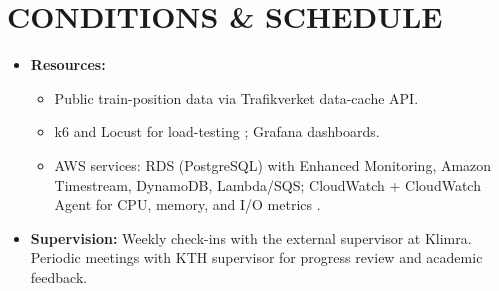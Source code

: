 \documentclass[11pt]{article}
\begin{document}
\section*{CONDITIONS \& SCHEDULE}

\begin{itemize}[leftmargin=*, label={}]
  \item %
  \textbf{Resources:}
    \begin{itemize}
            \item Public train-position data via Trafikverket data-cache API.
            \item k6 and Locust for load-testing \cite{k6Docs2025,LocustDoc2023}; Grafana dashboards.
            \item AWS services: RDS (PostgreSQL) with Enhanced Monitoring, Amazon Timestream, DynamoDB, Lambda/SQS; CloudWatch + CloudWatch Agent for CPU, memory, and I/O metrics \cite{AWSCloudWatch2025}.
        \end{itemize}
  
  \item %
  \textbf{Supervision:} Weekly check-ins with the external supervisor at Klimra. Periodic meetings with KTH supervisor for progress review and academic feedback.
  

\end{itemize}
\end{document}
